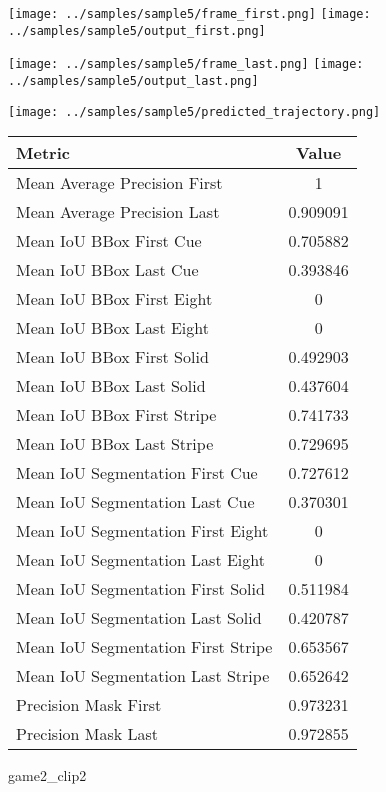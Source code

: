 \begin{figure}
\texttt{[image: ../samples/sample5/frame\_first.png]}
\texttt{[image: ../samples/sample5/output\_first.png]}\par
\texttt{[image: ../samples/sample5/frame\_last.png]}
\texttt{[image: ../samples/sample5/output\_last.png]}\par
\centering
\texttt{[image: ../samples/sample5/predicted\_trajectory.png]}
\caption{game2\_clip2}
\vspace{10pt}
\begin{tabular}{|l|c|}
\hline
\textbf{Metric} & \textbf{Value} \\
\hline
Mean Average Precision First & 1 \\
Mean Average Precision Last & 0.909091 \\
\hline
Mean IoU BBox First Cue & 0.705882 \\
Mean IoU BBox Last Cue & 0.393846 \\
Mean IoU BBox First Eight & 0 \\
Mean IoU BBox Last Eight & 0 \\
Mean IoU BBox First Solid & 0.492903 \\
Mean IoU BBox Last Solid & 0.437604 \\
Mean IoU BBox First Stripe & 0.741733 \\
Mean IoU BBox Last Stripe & 0.729695 \\
\hline
Mean IoU Segmentation First Cue & 0.727612 \\
Mean IoU Segmentation Last Cue & 0.370301 \\
Mean IoU Segmentation First Eight & 0 \\
Mean IoU Segmentation Last Eight & 0 \\
Mean IoU Segmentation First Solid & 0.511984 \\
Mean IoU Segmentation Last Solid & 0.420787 \\
Mean IoU Segmentation First Stripe & 0.653567 \\
Mean IoU Segmentation Last Stripe & 0.652642 \\
\hline
Precision Mask First & 0.973231 \\
Precision Mask Last & 0.972855 \\
\hline
\end{tabular}
\end{figure}

